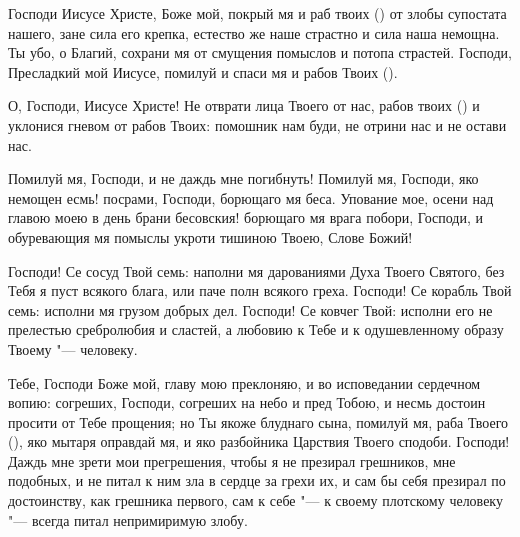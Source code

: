\begin{mymulticols}





Господи Иисусе Христе, Боже мой, покрый мя и раб твоих () от злобы супостата нашего, зане сила его крепка, естество же наше страстно и сила наша немощна. Ты убо, о Благий, сохрани мя от смущения помыслов и потопа страстей. Господи, Пресладкий мой Иисусе, помилуй и спаси мя и рабов Твоих ().




О, Господи, Иисусе Христе! Не отврати лица Твоего от нас, рабов твоих () и уклонися гневом от рабов Твоих: помошник нам буди, не отрини нас и не остави нас.




Помилуй мя, Господи, и не даждь мне погибнуть! Помилуй мя, Господи, яко немощен есмь! посрами, Господи, борющаго мя беса. Упование мое, осени над главою моею в день брани бесовския! борющаго мя врага побори, Господи, и обуревающия мя помыслы укроти тишиною Твоею, Слове Божий!




Господи! Се сосуд Твой семь: наполни мя дарованиями Духа Твоего Святого, без Тебя я пуст всякого блага, или паче полн всякого греха. Господи! Се корабль Твой семь: исполни мя грузом добрых дел. Господи! Се ковчег Твой: исполни его не прелестью сребролюбия и сластей, а любовию к Тебе и к одушевленному образу Твоему "--- человеку.



Тебе, Господи Боже мой, главу мою преклоняю, и во исповедании сердечном вопию: согреших, Господи, согреших на небо и пред Тобою, и несмь достоин просити от Тебе прощения; но Ты якоже блуднаго сына, помилуй мя, раба Твоего (), яко мытаря оправдай мя, и яко разбойника Царствия Твоего сподоби. Господи! Даждь мне зрети мои прегрешения, чтобы я не презирал грешников, мне подобных, и не питал к ним зла в сердце за грехи их, и сам бы себя презирал по достоинству, как грешника первого, сам к себе "--- к своему плотскому человеку "--- всегда питал непримиримую злобу.

\end{mymulticols}

